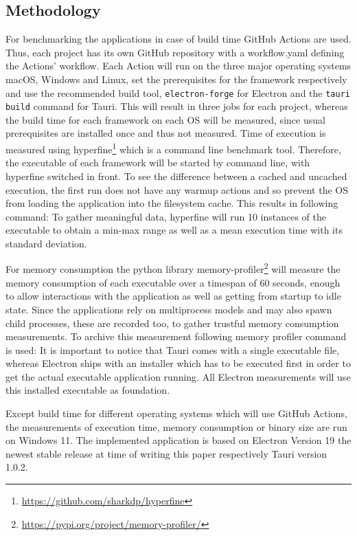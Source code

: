 \subsection{Methodology}
\label{subsec:method}
For benchmarking the applications in case of build time GitHub Actions are used.
Thus, each project has its own GitHub repository with a workflow.yaml defining the Actions' workflow.
Each Action will run on the three major operating systems macOS, Windows and Linux, set the prerequisites for the framework respectively and use the recommended build tool, \texttt{electron-forge} for Electron and the \texttt{tauri build} command for Tauri.
This will result in three jobs for each project, whereas the build time for each framework on each \ac{OS} will be measured, since usual prerequisites are installed once and thus not measured.
Time of execution is measured using hyperfine\footnote{\url{https://github.com/sharkdp/hyperfine}} which is a command line benchmark tool.
Therefore, the executable of each framework will be started by command line, with hyperfine switched in front.
To see the difference between a cached and uncached execution, the first run does not have any warmup actions and so prevent the \ac{OS} from loading the application into the filesystem cache.
This results in following command: 
To gather meaningful data, hyperfine will run 10 instances of the executable to obtain a min-max range as well as a mean execution time with its standard deviation.

For memory consumption the python library memory-profiler\footnote{\url{https://pypi.org/project/memory-profiler/}} will measure the memory consumption of each executable over a timespan of 60 seconds,
enough to allow interactions with the application as well as getting from startup to idle state.
Since the applications rely on multiprocess models and may also spawn child processes, these are recorded too, to gather trustful memory consumption measurements.
To archive this measurement following memory profiler command is used: 
It is important to notice that Tauri comes with a single executable file, whereas Electron ships with an installer which has to be executed first in order to get the actual executable application running.
All Electron measurements will use this installed executable as foundation.

Except build time for different operating systems which will use GitHub Actions, the measurements of execution time, memory consumption or binary size
are run on Windows 11.
The implemented application is based on Electron Version 19 the newest stable release at time of writing this paper respectively Tauri version 1.0.2.

